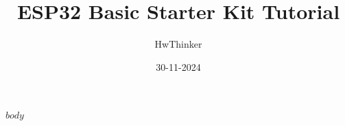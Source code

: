 \documentclass[12pt,a4paper]{book}
\title{ESP32 Basic Starter Kit Tutorial}
\author{HwThinker}
\date{30-11-2024}
\begin{document}
\maketitle
\tableofcontents

$body$
\end{document}
